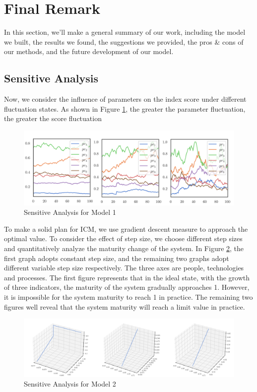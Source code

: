\documentclass{mcmthesis}
\begin{document}
\section{Final Remark}
In this section, we'll make a general summary of our work, including the model we built, the results we found, the suggestions we provided, the pros \& cons of our methods, and the future development of our model.

\subsection{Sensitive Analysis}
Now, we consider the influence of parameters on the index score under different fluctuation states. As shown in Figure \ref{figure::sen1}, the greater the parameter fluctuation, the greater the score fluctuation
\begin{figure}[!htbp]
    \small
    \centering
    \includegraphics[width=13cm]{figures/sen1.png}
    \caption{Sensitive Analysis for Model 1} 
    \label{figure::sen1}
\end{figure}

To make a solid plan for ICM, we use gradient descent measure to approach the optimal value. To consider the effect of step size, we choose different step sizes and quantitatively analyze the maturity change of the system. In Figure \ref{figure::sen2}, the first graph adopts constant step size, and the remaining two graphs adopt different variable step size respectively. The three axes are people, technologies and processes. The first figure represents that in the ideal state, with the growth of three indicators, the maturity of the system gradually approaches 1. However, it is impossible for the system maturity to reach 1 in practice. The remaining two figures well reveal that the system maturity will reach a limit value in practice.
\begin{figure}[!htbp]
    \small
    \centering
    \includegraphics[width=15cm]{figures/sen2.png}
    \caption{Sensitive Analysis for Model 2} 
    \label{figure::sen2}
\end{figure}
\end{document}
